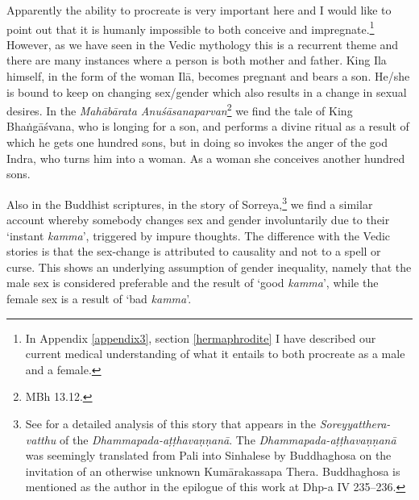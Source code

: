 Apparently the ability to procreate is very important here and I would like to point out that it is humanly impossible to both conceive and impregnate.\footnote{In Appendix \ref{appendix3}, section \ref{hermaphrodite} I have described our current medical understanding of what it entails to both procreate as a male and a female.} However, as we have seen in the Vedic mythology this is a recurrent theme and there are many instances where a person is both mother and father. King Ila himself, in the form of the woman Ilā, becomes pregnant and bears a son. He/she is bound to keep on changing sex/gender which also results in a change in sexual desires. In the \textit{Mahābārata Anuśāsanaparvan}\footnote{MBh 13.12.} we find the tale of King Bhaṅgāśvana, who is longing for a son, and performs a divine ritual as a result of which he gets one hundred sons, but in doing so invokes the anger of the god Indra, who turns him into a woman. As a woman she conceives another hundred sons. 

Also in the Buddhist scriptures, in the story of Sorreya,\footnote{See \cite{dhammadinna} for a detailed analysis of this story that appears in the \textit{Soreyyatthera-vatthu} of the \textit{Dhammapada-aṭṭhavaṇṇanā}. The \textit{Dhammapada-aṭṭhavaṇṇanā} was seemingly translated from Pali into Sinhalese by Buddhaghosa on the invitation of an otherwise unknown Kumārakassapa Thera. Buddhaghosa is mentioned as the author in the epilogue of this work at Dhp-a IV 235–236.} we find a similar account whereby somebody changes sex and gender involuntarily due to their `instant \textit{kamma}', triggered by impure thoughts. The difference with the Vedic stories is that the sex-change is attributed to causality and not to a spell or curse. This shows an underlying assumption of gender inequality, namely that the male sex is considered preferable and the result of `good \textit{kamma}', while the female sex is a result of `bad \textit{kamma}'.


